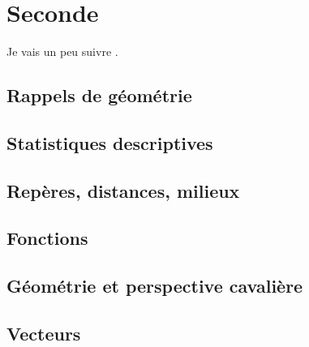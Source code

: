 




\makeindex
\makenomenclature







\newpage



\tableofcontents

\newpage

\part{Seconde}

Je vais un peu suivre \cite{oklaEg}.
\setcounter{chapter}{-1}

\chapter{Rappels de géométrie}


\chapter{Statistiques descriptives}




\chapter{Repères, distances, milieux}


\chapter{Fonctions}


\chapter{Géométrie et perspective cavalière}


\chapter{Vecteurs}


